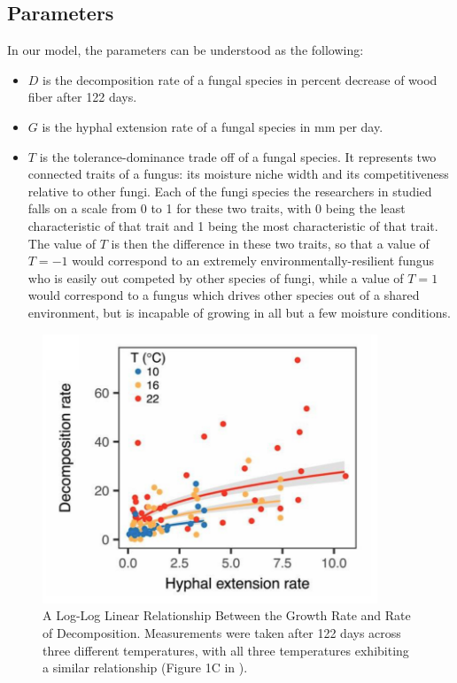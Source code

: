 \documentclass[12pt]{article}
\begin{document}
\subsection{Parameters}
In our model, the parameters can be understood as the following:
\begin{itemize}
\item $D$ is the decomposition rate of a fungal species in percent decrease of wood fiber after 122 days. 
\item $G$ is the hyphal extension rate of a fungal species in mm per day. 
\item $T$ is the tolerance-dominance trade off of a fungal species. 
It represents two connected traits of a fungus: its moisture niche width and its competitiveness relative to other fungi. 
Each of the fungi species the researchers in \cite{lustenhouwer} studied falls on a scale from 0 to 1 for these two traits, with 0 being the least characteristic of that trait and 1 being the most characteristic of that trait.
The value of $T$ is then the difference in these two traits, so that a value of $T = -1$ would correspond to an extremely environmentally-resilient fungus who is easily out competed by other species of fungi, while a value of $T = 1$ would correspond to a fungus which drives other species out of a shared environment, but is incapable of growing in all but a few moisture conditions. 
\end{itemize}

\begin{figure}[h!]
\begin{center}
\includegraphics[width=10cm]{GtoD.png}
\caption{A Log-Log Linear Relationship Between the Growth Rate and Rate of Decomposition. Measurements were taken after 122 days across three different temperatures, with all three temperatures exhibiting a similar relationship (Figure 1C in \cite{lustenhouwer}). }
\end{center}
\end{figure}
\end{document}
